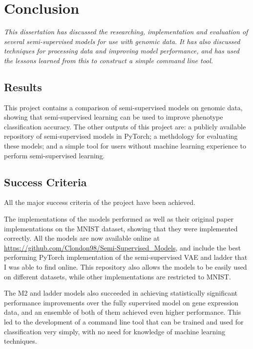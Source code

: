\chapter{Conclusion}

\textit{This dissertation has discussed the researching, implementation and evaluation of several semi-supervised models for use with genomic
data. It has also discussed techniques for processing data and improving model performance, and has used the lessons learned from 
this to construct a simple command line tool.}

\section{Results}

This project contains a comparison of semi-supervised models on genomic data, showing that semi-supervised learning can be used to 
improve phenotype classification accuracy. The other outputs of this project are: a publicly available repository of semi-supervised models in PyTorch; 
a methdology for evaluating these models; and a simple tool for users without machine learning experience to perform semi-supervised 
learning.

\section{Success Criteria}

All the major success criteria of the project have been achieved. 

The implementations of the models performed as well as their original paper implementations on the MNIST dataset, showing that they were 
implemented correctly. All the models are now available online at \url{https://github.com/Clondon98/Semi-Supervised_Models}, and include the 
best performing PyTorch implementation of the semi-supervised VAE and ladder that I was able to find online. This repository also allows 
the models to be easily used on different datasets, while other implementations are restricted to MNIST. 

The M2 and ladder models also succeeded in achieving statistically significant performance improvements over the fully supervised model on 
gene expression data, and an ensemble of both of them achieved even higher performance. This led to the development of a 
command line tool that can be trained and used for classification very simply, with no need for knowledge of machine learning techniques.

